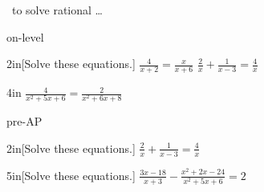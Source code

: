 \begin{myConceptSteps}{%
    ~to solve rational \dots}
\end{myConceptSteps}


\begin{taggedblock}{on-level}
    \begin{my2Problems}{2in}[Solve these equations.]
        {
            $
            \frac{4}{x+2}  
            =  
            \frac{x}{x+6}
            $
        }
        {
            $
            \frac{2}{x}  
            +
            \frac{1}{x-3}
            =  
            \frac{4}{x}
            $
        }
    \end{my2Problems}
    \begin{myWideProblem}{4in}
        {
            $
            \frac{4}{x^2+5x+6}  
            =  
            \frac{2}{x^2+6x+8}
            $
        }
    \end{myWideProblem}
\end{taggedblock}
\begin{taggedblock}{pre-AP}
    \begin{myWideProblem}{2in}[Solve these equations.]
        {
            $
            \frac{2}{x}  
            +
            \frac{1}{x-3}
            =  
            \frac{4}{x}
            $
        }
    \end{myWideProblem}
    \begin{myWideProblem}{5in}[Solve these equations.]
        {
            $
            \frac{3x-18}{x+3}  
            -
            \frac{x^2+2x-24}{x^2+5x+6}  
            =  
            2
            $
        }
    \end{myWideProblem}
\end{taggedblock}
